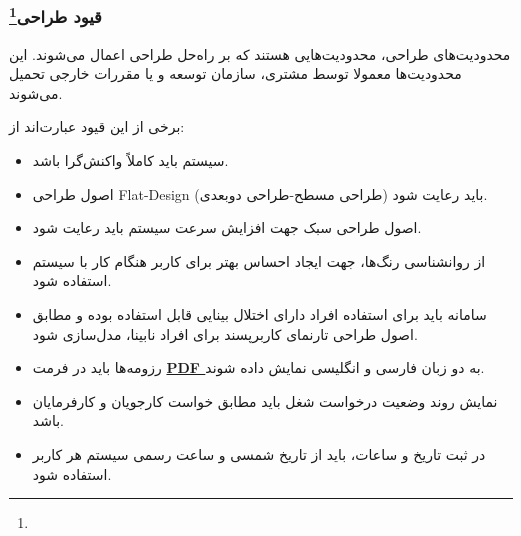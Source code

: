 \documentclass[12pt]{article}
\begin{document}
	\subsubsection{قیود طراحی\footnote{}}
	محدودیت‌های طراحی، محدودیت‌هایی هستند که بر راه‌حل طراحی اعمال می‌شوند. این محدودیت‌ها معمولا توسط مشتری، سازمان توسعه و یا مقررات خارجی تحمیل می‌شوند.

	برخی از این قیود عبارت‌اند از:
	\begin{itemize}
		\item
		سیستم باید کاملاً واکنش‌گرا باشد.
		\item
		اصول طراحی Flat-Design (طراحی مسطح-طراحی دوبعدی) باید رعایت شود.
		\item
		اصول طراحی سبک جهت افزایش سرعت سیستم باید رعایت شود.
		\item
		از روانشناسی رنگ‌ها، جهت ایجاد احساس بهتر برای کاربر هنگام کار با سیستم استفاده شود.
		\item
		سامانه باید برای استفاده افراد دارای اختلال بینایی قابل استفاده بوده و مطابق اصول طراحی تارنمای کاربر‌پسند برای افراد نابینا، مدل‌سازی شود.
		\item
		رزومه‌ها باید در فرمت \textbf{\hyperref[ref:pdf]{PDF }} به دو زبان فارسی و انگلیسی نمایش داده شوند.
		\item
		نمایش روند وضعیت درخواست شغل باید مطابق خواست کارجویان و کارفرمایان باشد.
		\item
		در ثبت تاریخ و ساعات، باید از تاریخ شمسی و ساعت رسمی سیستم هر کاربر استفاده شود.
	\end{itemize}
\end{document}
